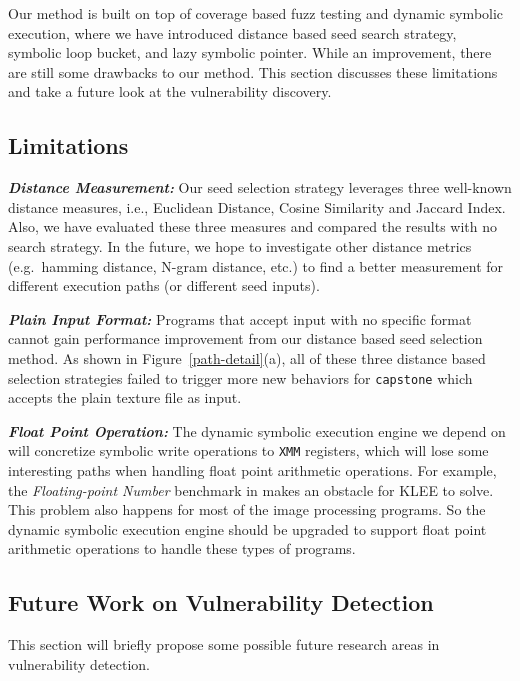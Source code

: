 Our method is built on top of coverage based fuzz testing and dynamic 
symbolic execution, where we have introduced distance based seed search 
strategy, symbolic loop bucket, and lazy symbolic pointer. While an 
improvement, there are still some drawbacks to our method. This section 
discusses these limitations and take a future look at 
the vulnerability discovery.
 
\subsection{Limitations}

\noindent\textit{\textbf{Distance Measurement:}} Our seed selection 
strategy leverages three well-known distance measures, i.e., 
Euclidean Distance, Cosine Similarity and Jaccard Index. Also, 
we have evaluated these three measures and compared the results 
with no search strategy. In the future, we hope to investigate 
other distance metrics (e.g.\ hamming distance, N-gram distance, 
etc.) to find a better measurement for different execution paths 
(or different seed inputs). 

\noindent\textit{\textbf{Plain Input Format:}} Programs that accept 
input with no specific format cannot gain performance improvement 
from our distance based seed selection method. As shown in 
Figure~\ref{path-detail}(a), all of these three distance based 
selection strategies failed to trigger more new behaviors for 
\texttt{capstone} which accepts the plain texture file as input. 

\noindent\textit{\textbf{Float Point Operation:}} The dynamic 
symbolic execution engine we depend on will concretize symbolic 
write operations to \texttt{XMM} registers, which will lose some 
interesting paths when handling float point arithmetic operations. 
For example, the \emph{Floating-point Number} benchmark in \cite{xu2017benchmarking}
makes an obstacle for KLEE to solve.
This problem also happens for most of the image processing programs. 
So the dynamic symbolic execution engine should be upgraded to 
support float point arithmetic operations to handle 
these types of programs.

\subsection{Future Work on Vulnerability Detection}
This section will briefly propose some possible future 
research areas in vulnerability detection.

